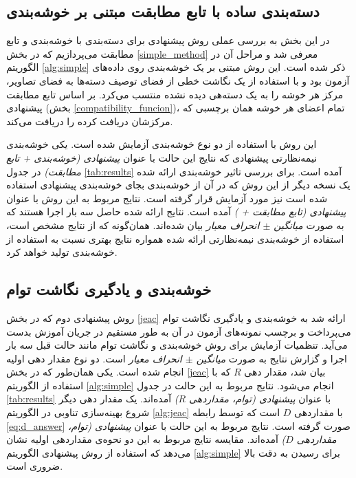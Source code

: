 \subsection{دسته‌بندی ساده با تابع مطابقت مبتنی بر خوشه‌بندی}
در این بخش به بررسی عملی روش پیشنهادی برای دسته‌بندی با خوشه‌بندی و تابع مطابقت می‌پردازیم که  در بخش \ref{simple_method} معرفی شد و مراحل آن در الگوریتم \ref{alg:simple} ذکر شده است. این روش مبتنی بر یک خوشه‌بندی روی داده‌های آزمون بود و با استفاده از یک نگاشت خطی از فضای توصیف دسته‌ها به فضای تصاویر، مرکز هر خوشه را به یک دسته‌هی دیده نشده منتسب می‌کرد. بر اساس تابع مطابقت پیشنهادی (بخش \ref{compatibility_funcion})، تمام اعضای هر خوشه همان برچسبی که مرکزشان دریافت کرده را دریافت می‌کند.

این روش با استفاده از دو نوع خوشه‌بندی آزمایش شده است. یکی خوشه‌بندی نیمه‌نظارتی پیشنهادی که نتایج این حالت با عنوان
\textit{پیشنهادی (خوشه‌بندی + تابع مطابقت) }
در جدول \ref{tab:results} آمده است.
 برای بررسی تاثیر خوشه‌بندی ارائه شده یک نسخه دیگر از این روش که در آن از خوشه‌بندی  بجای خوشه‌بندی پیشنهادی استفاده شده است نیز مورد آزمایش قرار گرفته است. نتایج مربوط به این روش با عنوان
\textit{ پیشنهادی (تابع مطابقت +  ) }
آمده است. نتایج ارائه شده حاصل سه بار اجرا هستند که به صورت
\textit{ میانگین $\pm$ انحراف معیار }
بیان شده‌اند. همان‌گونه که از نتایج مشخص است، استفاده از خوشه‌بندی نیمه‌نظارتی ارائه شده همواره نتایج بهتری نسبت به استفاده از خوشه‌بندی   تولید خواهد کرد.
\subsection{ خوشه‌بندی و یادگیری نگاشت توام}\label{exp:jeac}
روش پیشنهادی دوم که در بخش \ref{jeac} ارائه شد به خوشه‌بندی و یادگیری نگاشت توام می‌پرداخت و برچسب نمونه‌های آزمون در آن به طور مستقیم در جریان آموزش بدست می‌آید.
تنظمیات آزمایش برای روش خوشه‌بندی و نگاشت توام مانند حالت قبل سه بار اجرا و گزارش نتایج به صورت \textit{ میانگین $\pm$ انحراف معیار } است. دو نوع  مقدار دهی اولیه انجام شده است. یکی همان‌طور که در بخش \ref{jeac} بیان شد، مقدار دهی $R$ که با استفاده از الگوریتم
\ref{alg:simple}
انجام می‌شود. نتایج مربوط به این حالت در جدول  \ref{tab:results} با عنوان
\textit{ پیشنهادی (توام، مقداردهی $R$)}
آمده‌اند. یک مقدار دهی دیگر شروع بهینه‌سازی تناوبی در الگوریتم
\ref{alg:jeac}
 با مقداردهی $D$ است که توسط رابطه
\eqref{eq:d_answer}
صورت گرفته است. نتایج مربوط به این حالت با عنوان
\textit{پیشنهادی (توام، مقداردهی $D$)}
آمده‌اند. مقایسه نتایج مربوط به این دو نحوه‌ی مقداردهی اولیه نشان می‌دهد که استفاده از روش پیشنهادی الگوریتم \ref{alg:simple}  برای رسیدن به دقت بالا ضروری است.

